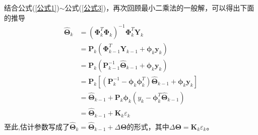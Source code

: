 结合公式(\ref{公式1})$\sim$公式(\ref{公式3})，再次回顾最小二乘法的一般解，可以得出下面的推导
\begin{equation}
\begin{aligned}
\hat{\symbf{\Theta}}_{k}&=\left(\symbf{\Phi}_{k}^{T} \symbf{\Phi}_{k}\right)^{-1} \symbf{\Phi}_{k}^{T} \symbf{Y}_{k}\\
&=\symbf{P}_{k}\left(\symbf{\Phi}_{k-1}^{T} \symbf{Y}_{k-1}+\symbf{\phi}_{k} \symbf{y}_{k}\right) \\
&=\symbf{P}_{k}\left(\symbf{P}_{k-1}^{-1} \hat{\symbf{\Theta}}_{k-1}+\symbf{\phi}_{k} \symbf{y}_{k}\right) \\
&=\symbf{P}_{k}\left[\left(\symbf{P}_{k}^{-1}-\symbf{\phi}_{k} \symbf{\phi}_{k}^{T}\right) \hat{\symbf{\Theta}}_{k-1}+\symbf{\phi}_{k} \symbf{y}_{k}\right] \\
&=\hat{\symbf{\Theta}}_{k-1}+\symbf{P}_{k} \symbf{\phi}_{k}\left(y_{k}-\symbf{\phi}_{k}^{T}\hat{\symbf{\Theta}}_{k-1}\right)\\
&=\hat{\symbf{\Theta}}_{k-1}+\symbf{K}_{k} \varepsilon_{k}\\
\end{aligned}
\end{equation}
至此,估计参数写成了$\hat{\symbf{\Theta}}_{k}=\hat{\symbf{\Theta}}_{k-1}+\Delta\symbf{\Theta}$的形式，其中$\Delta\symbf{\Theta}=\symbf{K}_k\varepsilon_{k}$。

